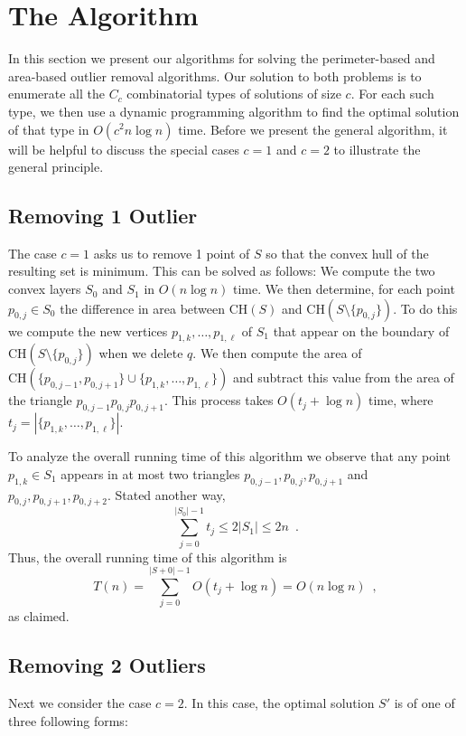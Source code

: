 \documentclass[lotsofwhite]{patmorin}
\newcommand{\ch}{\mathrm{CH}}
\begin{document}
\section{The Algorithm}

In this section we present our algorithms for solving the
perimeter-based and area-based outlier removal algorithms. Our
solution to both problems is to enumerate all the $C_c$ combinatorial
types of solutions of size $c$.  For each such type, we then use a
dynamic programming algorithm to find the optimal solution of that
type in $O(c^2 n\log n)$ time.  Before we present the general
algorithm, it will be helpful to discuss the special cases $c=1$ and
$c=2$ to illustrate the general principle.

\subsection{Removing 1 Outlier}

The case $c=1$ asks us to remove 1 point of $S$ so that the convex
hull of the resulting set is minimum.  This can be solved as follows:
We compute the two convex layers $S_0$ and $S_1$ in $O(n\log n)$ time.
We then determine, for each point $p_{0,j}\in S_0$ the difference in
area between $\ch(S)$ and $\ch(S\setminus\{p_{0,j}\})$.  To do this we
compute the new vertices $p_{1,k},\ldots,p_{1,\ell}$ of $S_1$ that
appear on the boundary of $\ch(S\setminus\{p_{0,j}\})$ when we delete
$q$.  We then compute the area of
$\ch(\{p_{0,j-1},p_{0,j+1}\}\cup\{p_{1,k},\ldots,p_{1,\ell}\})$ and
subtract this value from the area of the triangle
$p_{0,j-1}p_{0,j}p_{0,j+1}$.   This
process takes $O(t_j+\log n)$ time, where
$t_j=|\{p_{1,k},\ldots,p_{1,\ell}\}|$.

To analyze the overall running time of this algorithm we observe that
any point $p_{1,k}\in S_1$ appears in at most two triangles
$p_{0,j-1},p_{0,j},p_{0,j+1}$ and
$p_{0,j},p_{0,j+1},p_{0,j+2}$.  Stated another way,
\[
     \sum_{j=0}^{|S_0|-1} t_j \le 2|S_1|\le 2n \enspace .
\]
Thus, the overall running time of this algorithm is
\[
     T(n) = \sum_{j=0}^{|S+0|-1} O(t_j+\log n) = O(n\log n) \enspace ,
\]
as claimed.

\subsection{Removing 2 Outliers}

Next we consider the case $c=2$.  In this case, the optimal solution
$S'$ is of one of three following forms:
\end{document}
